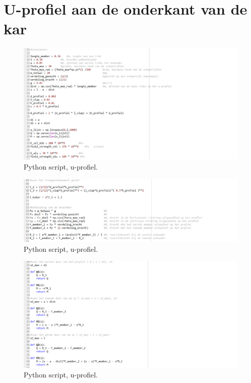 \section{U-profiel aan de onderkant van de kar}
\label{se: onderkant_u-profiel}

\begin{figure}[H]
    \centering
    \includegraphics[width = 120mm]{06_bijlage_F/onderkant_u_profiel/constanten_onderkant.PNG}
    \caption{Python script, u-profiel.}
    \label{fig:u-profiel_constanten}
\end{figure}
\vspace{\baselineskip}

\begin{figure}[H]
    \centering
    \includegraphics[width = 120mm]{06_bijlage_F/onderkant_u_profiel/krachtenanalyse_onderkant.PNG}
    \caption{Python script, u-profiel.}
    \label{fig:u-profiel_krachtenanalyse}
\end{figure}
\vspace{\baselineskip}

\begin{figure}[H]
    \centering
    \includegraphics[width = 120mm]{06_bijlage_F/onderkant_u_profiel/formules_onderkant.PNG}
    \caption{Python script, u-profiel.}
    \label{fig:u-profiel_formules}
\end{figure}
\vspace{\baselineskip}

